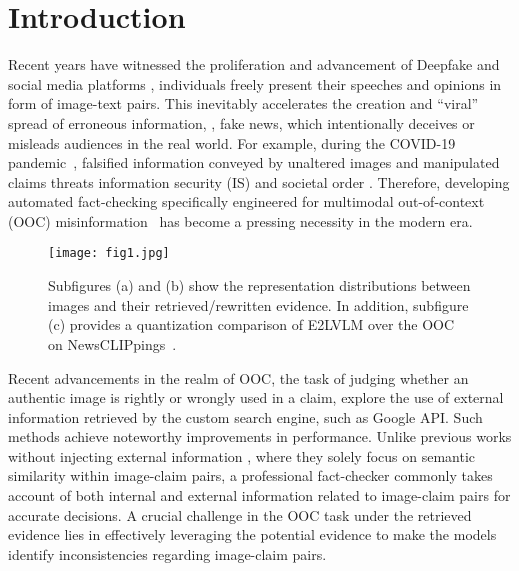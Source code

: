 \section{Introduction}
\label{sec:intro}

Recent years have witnessed the proliferation and advancement of Deepfake and social media platforms \cite{taigman2014deepface, liu2024forgery, qi2024sniffer, wang2024mmidr, shao2024detecting}, individuals freely present their speeches and opinions in form of image-text pairs. This inevitably accelerates the creation and ``viral'' spread of erroneous information, \ie, fake news, which intentionally deceives or misleads audiences in the real world. For example, during the COVID-19 pandemic~\cite{naeem2020covid}, falsified information conveyed by unaltered images and manipulated claims threats information security (IS) and societal order \cite{bohacek2024making, lin2024detecting}. Therefore, developing automated fact-checking specifically engineered for multimodal out-of-context (OOC) misinformation~\cite{abdelnabi2022open} has become a pressing necessity in the modern era.


\begin{figure}[t]
  \centering
   \texttt{[image: fig1.jpg]}
   \caption{Subfigures (a) and (b) show the representation distributions between images and their retrieved/rewritten evidence. In addition, subfigure (c) provides a quantization comparison of E2LVLM over the OOC on NewsCLIPpings~\cite{luo2021newsclippings}.}
   \label{fig:1}
\end{figure}

Recent advancements \cite{yuan2023support, zhang2023ecenet, papadopoulos2023red} in the realm of OOC, the task of judging whether an authentic image is rightly or wrongly used in a claim, explore the use of external information retrieved by the custom search engine, such as Google API. Such methods achieve noteworthy improvements in performance. Unlike previous works without injecting external information \cite{aneja2023cosmos, mu2023self, dang2024overview}, where they solely focus on semantic similarity within image-claim pairs, a professional fact-checker commonly takes account of both internal and external information related to image-claim pairs for accurate decisions. A crucial challenge in the OOC task under the retrieved evidence lies in effectively leveraging the potential evidence to make the models identify inconsistencies regarding image-claim pairs.

